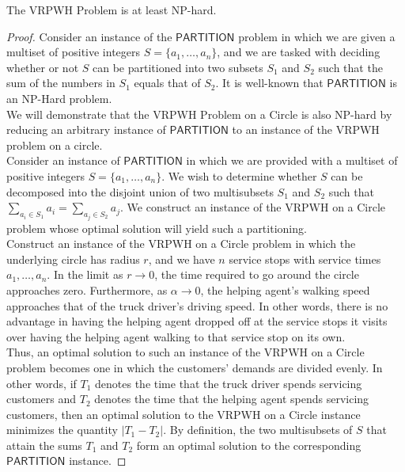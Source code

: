 \documentclass[12pt]{scrartcl}
\begin{document}
\begin{proposition}
The VRPWH Problem is at least NP-hard. 
\end{proposition}
\begin{proof}
Consider an instance of the $\mathsf{PARTITION}$ problem in which we are given a multiset of positive integers $S = \{a_1, \ldots, a_n\}$, and we are tasked with deciding whether or not $S$ can be partitioned into two subsets $S_1$ and $S_2$ such that the sum of the numbers in $S_1$ equals that of $S_2$. It is well-known that $\mathsf{PARTITION}$ is an NP-Hard problem. \\ 

We will demonstrate that the VRPWH Problem on a Circle is also NP-hard by reducing an arbitrary instance of $\mathsf{PARTITION}$ to an instance of the VRPWH problem on a circle. \\

Consider an instance of $\mathsf{PARTITION}$ in which we are provided with a multiset of positive integers $S = \{a_1, \ldots, a_n\}$. We wish to determine whether $S$ can be decomposed into the disjoint union of two multisubsets $S_1$ and $S_2$ such that $\sum_{a_i \in S_1} a_i = \sum_{a_j \in S_2} a_j$. We construct an instance of the VRPWH on a Circle problem whose optimal solution will yield such a partitioning. \\

Construct an instance of the VRPWH on a Circle problem in which the underlying circle has radius $r$, and we have $n$ service stops with service times $a_1, \ldots, a_n$. In the limit as $r \to 0$, the time required to go around the circle approaches zero. Furthermore, as $\alpha \to 0$, the helping agent's walking speed approaches that of the truck driver's driving speed. In other words, there is no advantage in having the helping agent dropped off at the service stops it visits over having the helping agent walking to that service stop on its own. \\

Thus, an optimal solution to such an instance of the VRPWH on a Circle problem becomes one in which the customers' demands are divided evenly. In other words, if $T_1$ denotes the time that the truck driver spends servicing customers and $T_2$ denotes the time that the helping agent spends servicing customers, then an optimal solution to the VRPWH on a Circle instance minimizes the quantity $|T_1 - T_2|$. By definition, the two multisubsets of $S$ that attain the sums $T_1$ and $T_2$ form an optimal solution to the corresponding $\mathsf{PARTITION}$ instance. 
\end{proof}
\end{document}
